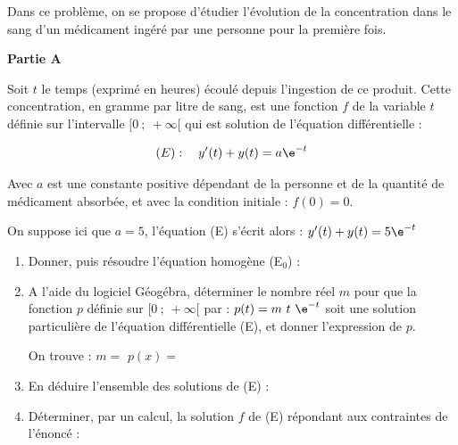 Dans ce problème, on se propose d’étudier l’évolution de la concentration dans le sang d’un médicament ingéré par une personne pour la première fois.

\medskip

{\bf Partie A}\par \medskip

Soit $t$ le temps (exprimé en heures) écoulé depuis l’ingestion de ce produit. Cette concentration, en gramme par litre de sang, est une fonction $f$ de la variable $t$ définie sur l’intervalle $[0~;~+\infty[$ qui est solution de l’équation différentielle :

$$(E) : \quad y'(t)+y(t)= a\e^{-t} $$

Avec $a$ est une constante positive dépendant de la personne et de la quantité de médicament absorbée, et avec la condition initiale : $f (0) = 0$.

On suppose ici que $a = 5$, l’équation (E) s’écrit alors : $y'(t)+y(t)= 5\e^{-t}$

\begin{enumerate}
	\item Donner, puis résoudre l'équation homogène (E$_0$) :\par \vspace*{0.5cm}

	\item A l’aide du logiciel Géogébra, déterminer le nombre réel $m$ pour que la fonction $p$ définie sur $[0~;~+\infty[$ par : $p(t) = m~t~\e^{-t}$ soit une solution particulière de l'équation différentielle (E), et donner l’expression de $p$. 
	
	
	On trouve : \hfill $m=$\makebox[0.1\linewidth]{\dotfill} \hfill $p(x)=$\makebox[0.3\linewidth]{\dotfill}

	\smallskip
	
	\appelprof
	
	\item En déduire l'ensemble des solutions de (E) : \par \vspace*{0.5cm}

	\item Déterminer, par un calcul, la solution $f$ de (E) répondant aux contraintes de l'énoncé : \par \vspace*{0.5cm}


\end{enumerate}

